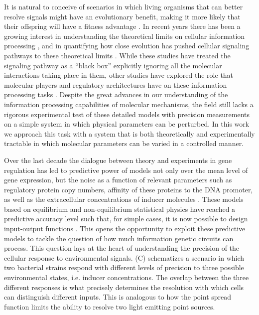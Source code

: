 It is natural to conceive of scenarios in which living organisms that can
better resolve signals might have an evolutionary benefit, making it more
likely that their offspring will have a fitness advantage \cite{Taylor2007}. In
recent years there has been a growing interest in understanding the theoretical
limits on cellular information processing \cite{Bialek2005, Gregor2007}, and in
quantifying how close evolution has pushed cellular signaling pathways to these
theoretical limits \cite{Tkacik2008, Dubuis2013, Petkova2019}. While these
studies have treated the signaling pathway as a ``black box'' explicitly
ignoring all the molecular interactions taking place in them, other studies
have explored the role that molecular players and regulatory architectures have
on these information processing tasks \cite{Rieckh2014, Ziv2007, Voliotis2014a,
Tostevin2009, Tkacik2011, Tkacik2008a, Tabbaa2014}. Despite the great advances
in our understanding of the information processing capabilities of molecular
mechanisms, the field still lacks a rigorous experimental test of these
detailed models with precision measurements on a simple system in which
physical parameters can be perturbed. In this work we approach this task with a
system that is both theoretically and experimentally tractable in which
molecular parameters can be varied in a controlled manner.

Over the last decade the dialogue between theory and experiments in gene
regulation has led to predictive power of models not only over the mean level
of gene expression, but the noise as a function of relevant parameters such as
regulatory protein copy numbers, affinity of these proteins to the DNA
promoter, as well as the extracellular concentrations of inducer molecules
\cite{Golding2005, Garcia2011c, Vilar2013, Xu2015}. These models based on
equilibrium and non-equilibrium statistical physics have reached a predictive
accuracy level such that, for simple cases, it is now possible to design
input-output functions \cite{Brewster2012, Barnes2019}. This opens the
opportunity to exploit these predictive models to tackle the question of how
much information genetic circuits can process. This question lays at the heart
of understanding the precision of the cellular response to environmental
signals. (C) schematizes a scenario in which two bacterial
strains respond with different levels of precision to three possible
environmental states, i.e. inducer concentrations. The overlap between the
three different responses is what precisely determines the resolution with
which cells can distinguish different inputs. This is analogous to how the
point spread function limits the ability to resolve two light emitting point
sources.

